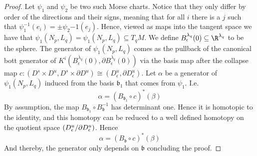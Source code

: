 \begin{proof}
	Let $\psi_1$ and $\psi_2$ be two such Morse charts. Notice that they only differ by order of the directions and their signs, meaning that for all $i$ there is a $j$ such that $\psi_1^{-1}(e_i)=\pm \psi_2{-1}(e_j)$. Hence, viewed as maps into the tangent space we have that $\psi_1(N_p,L_q)=\psi_1(N_p,L_q)\subseteq T_qM$. We define $B^{\lambda_{q}}_{\epsilon}(0)\subseteq \R^{\lambda_q}$ to be the sphere. The generator of $\psi_1(N_p,L_q)$ comes as the pullback of the canonical bott generator of $K^i(B^{\lambda_{q}}_{\epsilon}(0),\partial B^{\lambda_{q}}_{\epsilon}(0))$ via the basis map after the collapse map $c:(D^{ s}\times  D^{u }, D^{s}\times \partial D^{u}) \cong (D^{u}_{\epsilon},\partial D^{u}_{\epsilon} )$. Let $\alpha$ be a generator of $\psi_1(N_p,L_q)$ induced from the basis $\mathfrak{b_1}$ that comes from $\psi_1$. I.e. 
	\begin{equation*}
		\alpha=\left( B_{\mathfrak{b}_1}\circ c\right)^*(\beta)
	\end{equation*} By assumption, the map $ B_{\mathfrak{b}_1}\circ  B_{\mathfrak{b}}^{-1}$ has determinant one. Hence it is homotopic to the identity, and this homotopy can be reduced to a well defined homotopy on the quotient space $\left(D^{u}_{\epsilon}\middle/ \partial D^{u}_{\epsilon} \right)$. Hence
	\begin{equation*}
		\alpha=\left( B_{\mathfrak{b}}\circ c\right)^*(\beta)
	\end{equation*} And thereby, the generator only depends on $\mathfrak{b}$ concluding the proof.
\end{proof}

